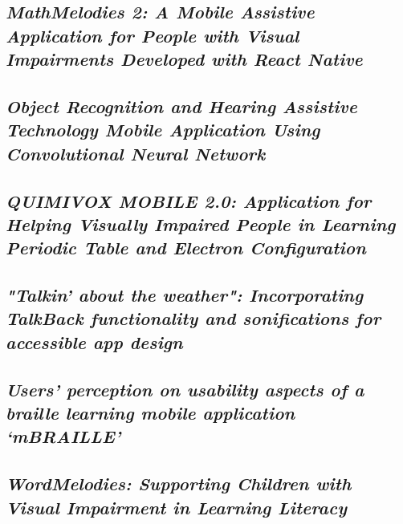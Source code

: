 \lipsum[31]

\subsection{\emph{MathMelodies 2: A Mobile Assistive Application for People with Visual Impairments Developed with React Native}}

\lipsum[31]

\subsection{\emph{Object Recognition and Hearing Assistive Technology Mobile Application Using Convolutional Neural Network}}

\lipsum[31]

\subsection{\emph{QUIMIVOX MOBILE 2.0: Application for Helping Visually Impaired People in Learning Periodic Table and Electron Configuration}}

\lipsum[31]

\subsection{\emph{"Talkin' about the weather": Incorporating TalkBack functionality and sonifications for accessible app design}}

\lipsum[31]

\subsection{\emph{Users’ perception on usability aspects of a braille learning mobile application ‘mBRAILLE’}}

\lipsum[31]

\subsection{\emph{WordMelodies: Supporting Children with Visual Impairment in Learning Literacy}}

\lipsum[31]
